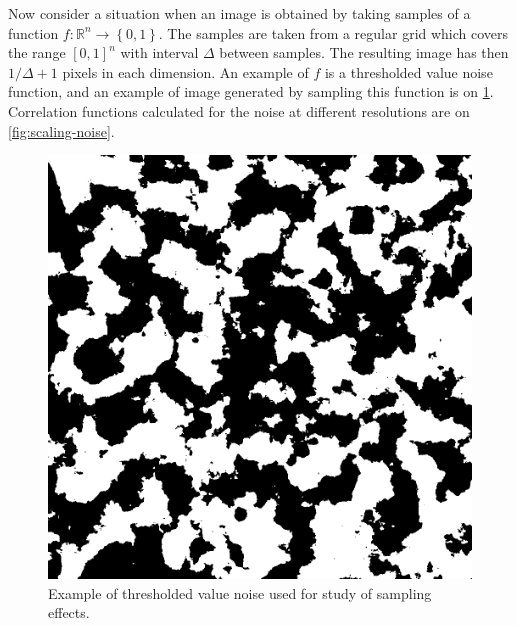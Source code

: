 \documentclass[reprint,amsmath,amssymb,aps,pre]{revtex4-1}
\begin{document}
Now consider a situation when an image is obtained by taking samples of a function
$f: \mathbb{R}^n \rightarrow \left\{0, 1\right\}$. The samples are taken from a
regular grid which covers the range $[0, 1]^n$  with interval $\Delta$ between
samples. The resulting image has then $1/\Delta + 1$ pixels in each
dimension. An example of $f$ is a thresholded value noise function, and an
example of image generated by sampling this function is on
\cref{fig:noise}. Correlation functions calculated for the noise at different
resolutions are on \cref{fig:scaling-noise}.

\begin{figure}[ht]
  \centering
  \includegraphics[width=0.9\linewidth]{images/noise.png}
  \caption[]{Example of thresholded value noise used for study of sampling
    effects.}
  \label{fig:noise}
\end{figure}
\end{document}

